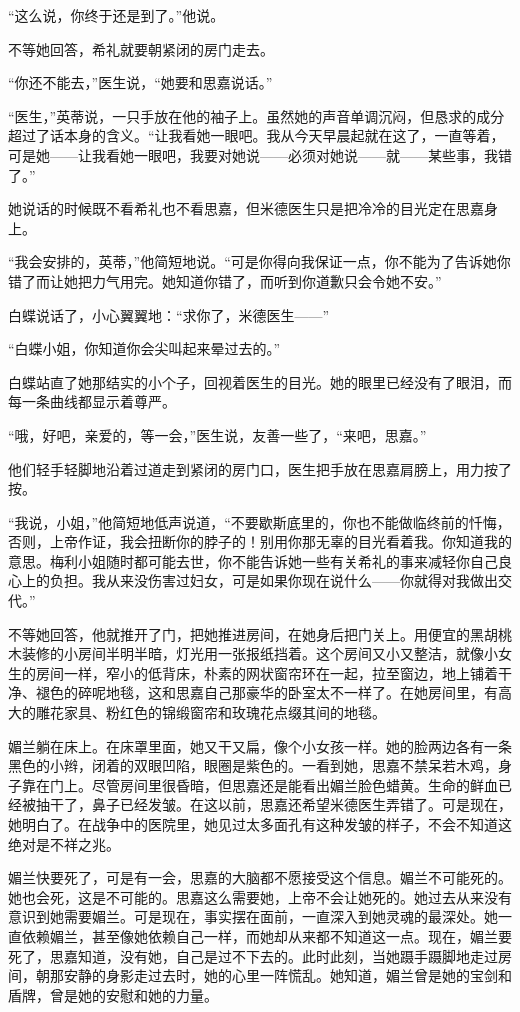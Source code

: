 \par “这么说，你终于还是到了。”他说。
\par 不等她回答，希礼就要朝紧闭的房门走去。
\par “你还不能去，”医生说，“她要和思嘉说话。”
\par “医生，”英蒂说，一只手放在他的袖子上。虽然她的声音单调沉闷，但恳求的成分超过了话本身的含义。“让我看她一眼吧。我从今天早晨起就在这了，一直等着，可是她——让我看她一眼吧，我要对她说——必须对她说——就——某些事，我错了。”
\par 她说话的时候既不看希礼也不看思嘉，但米德医生只是把冷冷的目光定在思嘉身上。
\par “我会安排的，英蒂，”他简短地说。“可是你得向我保证一点，你不能为了告诉她你错了而让她把力气用完。她知道你错了，而听到你道歉只会令她不安。”
\par 白蝶说话了，小心翼翼地：“求你了，米德医生——”
\par “白蝶小姐，你知道你会尖叫起来晕过去的。”
\par 白蝶站直了她那结实的小个子，回视着医生的目光。她的眼里已经没有了眼泪，而每一条曲线都显示着尊严。
\par “哦，好吧，亲爱的，等一会，”医生说，友善一些了，“来吧，思嘉。”
\par 他们轻手轻脚地沿着过道走到紧闭的房门口，医生把手放在思嘉肩膀上，用力按了按。
\par “我说，小姐，”他简短地低声说道，“不要歇斯底里的，你也不能做临终前的忏悔，否则，上帝作证，我会扭断你的脖子的！别用你那无辜的目光看着我。你知道我的意思。梅利小姐随时都可能去世，你不能告诉她一些有关希礼的事来减轻你自己良心上的负担。我从来没伤害过妇女，可是如果你现在说什么——你就得对我做出交代。”
\par 不等她回答，他就推开了门，把她推进房间，在她身后把门关上。用便宜的黑胡桃木装修的小房间半明半暗，灯光用一张报纸挡着。这个房间又小又整洁，就像小女生的房间一样，窄小的低背床，朴素的网状窗帘环在一起，拉至窗边，地上铺着干净、褪色的碎呢地毯，这和思嘉自己那豪华的卧室太不一样了。在她房间里，有高大的雕花家具、粉红色的锦缎窗帘和玫瑰花点缀其间的地毯。
\par 媚兰躺在床上。在床罩里面，她又干又扁，像个小女孩一样。她的脸两边各有一条黑色的小辫，闭着的双眼凹陷，眼圈是紫色的。一看到她，思嘉不禁呆若木鸡，身子靠在门上。尽管房间里很昏暗，但思嘉还是能看出媚兰脸色蜡黄。生命的鲜血已经被抽干了，鼻子已经发皱。在这以前，思嘉还希望米德医生弄错了。可是现在，她明白了。在战争中的医院里，她见过太多面孔有这种发皱的样子，不会不知道这绝对是不祥之兆。
\par 媚兰快要死了，可是有一会，思嘉的大脑都不愿接受这个信息。媚兰不可能死的。她也会死，这是不可能的。思嘉这么需要她，上帝不会让她死的。她过去从来没有意识到她需要媚兰。可是现在，事实摆在面前，一直深入到她灵魂的最深处。她一直依赖媚兰，甚至像她依赖自己一样，而她却从来都不知道这一点。现在，媚兰要死了，思嘉知道，没有她，自己是过不下去的。此时此刻，当她蹑手蹑脚地走过房间，朝那安静的身影走过去时，她的心里一阵慌乱。她知道，媚兰曾是她的宝剑和盾牌，曾是她的安慰和她的力量。
